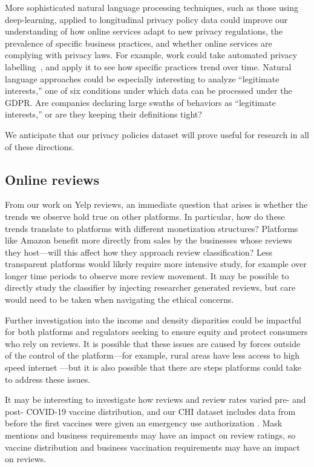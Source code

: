 More sophisticated natural language processing techniques, such as those using deep-learning, applied to longitudinal privacy policy data could improve our understanding of how online services adapt to new privacy regulations, the prevalence of specific business practices, and whether online services are complying with privacy laws. For example, work could take automated privacy labelling~\cite{harkous2018polisis,alabduljabbar2021automated}, and apply it to see how specific practices trend over time. Natural language approaches could be especially interesting to analyze ``legitimate interests,'' one of six conditions under which data can be processed under the GDPR. Are companies declaring large swaths of behaviors as ``legitimate interests,'' or are they keeping their definitions tight?

We anticipate that our privacy policies dataset will prove useful for research in all of these directions.

\subsection{Online reviews} \label{subsec:conclusion:reviews}
From our work on Yelp reviews, an immediate question that arises is whether the trends we observe hold true on other platforms. In particular, how do these trends translate to platforms with different monetization structures? Platforms like Amazon benefit more directly from sales by the businesses whose reviews they host---will this affect how they approach review classification? Less transparent platforms would likely require more intensive study, for example over longer time periods to observe more review movement. It may be possible to directly study the classifier by injecting researcher generated reviews, but care would need to be taken when navigating the ethical concerns. 

Further investigation into the income and density disparities could be impactful for both platforms and regulators seeking to ensure equity and protect consumers who rely on reviews. It is possible that these issues are caused by forces outside of the control of the platform---for example, rural areas have less access to high speed internet \cite{fcc2020broadband}---but it is also possible that there are steps platforms could take to address these issues.

It may be interesting to investigate how reviews and review rates varied pre- and post- COVID-19 vaccine distribution, and our CHI dataset includes data from before the first vaccines were given an emergency use authorization \cite{nature2020moderna}. Mask mentions and business requirements may have an impact on review ratings, so vaccine distribution and business vaccination requirements may have an impact on reviews.

